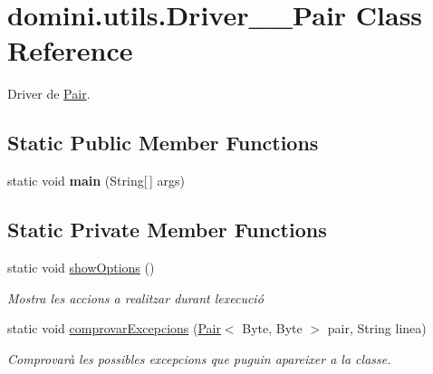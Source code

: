 \hypertarget{classdomini_1_1utils_1_1Driver____Pair}{}\section{domini.\+utils.\+Driver\+\_\+\+\_\+\+Pair Class Reference}
\label{classdomini_1_1utils_1_1Driver____Pair}


Driver de \hyperlink{classdomini_1_1utils_1_1Pair}{Pair}.  


\subsection*{Static Public Member Functions}
\begin{DoxyCompactItemize}
\item 
\mbox{\label{classdomini_1_1utils_1_1Driver____Pair_a6f6dda90b506c692dd03c4fc174550b7}} 
static void {\bfseries main} (String\mbox{[}$\,$\mbox{]} args)
\end{DoxyCompactItemize}
\subsection*{Static Private Member Functions}
\begin{DoxyCompactItemize}
\item 
\mbox{\label{classdomini_1_1utils_1_1Driver____Pair_a97596378f21ba4ab9c0c4ccb4041425b}} 
static void \hyperlink{classdomini_1_1utils_1_1Driver____Pair_a97596378f21ba4ab9c0c4ccb4041425b}{show\+Options} ()
\begin{DoxyCompactList}\small\item\em Mostra les accions a realitzar durant l\textquotesingle{}execució \end{DoxyCompactList}\item 
static void \hyperlink{classdomini_1_1utils_1_1Driver____Pair_a640e07e7811e0b56a99ca1afb7e16b65}{comprovar\+Excepcions} (\hyperlink{classdomini_1_1utils_1_1Pair}{Pair}$<$ Byte, Byte $>$ pair, String linea)
\begin{DoxyCompactList}\small\item\em Comprovarà les possibles excepcions que puguin apareixer a la classe. \end{DoxyCompactList}\end{DoxyCompactItemize}


